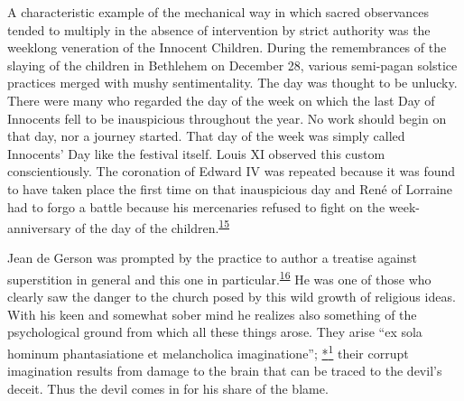 A characteristic example of the mechanical way in which sacred
observances tended to multiply in the absence of intervention by strict
authority was the weeklong veneration of the Innocent Children. During
the remembrances of the slaying of the children in Bethlehem on December
28, various semi-pagan solstice practices merged with mushy
sentimentality. The day was thought to be unlucky. There were many who
regarded the day of the week on which the last Day of Innocents fell to
be inauspicious throughout the year. No work should begin on that day,
nor a journey started. That day of the week was simply called Innocents'
Day like the festival itself. Louis XI observed this custom
conscientiously. The coronation of Edward IV was repeated because it was
found to have taken place the first time on that inauspicious day and
René of Lorraine had to forgo a battle because his mercenaries refused
to fight on the week-anniversary of the day of the
children.\textsuperscript{\protect\hypertarget{13_Chapter_Six__THE_DEPICTION_OF_TH.xhtmlux5cux23id_1241}{\protect\hyperlink{23_NOTES.xhtmlux5cux23id_1242}{15}}}

Jean de Gerson was prompted by the practice to author a treatise against
superstition in general and this one in
particular.\textsuperscript{\protect\hypertarget{13_Chapter_Six__THE_DEPICTION_OF_TH.xhtmlux5cux23id_1239}{\protect\hyperlink{23_NOTES.xhtmlux5cux23id_1240}{16}}}
He was one of those who clearly saw the danger to the church posed by
this wild growth of religious ideas. With his keen and somewhat sober
mind he realizes also something of the psychological ground from which
all these things arose. They arise ``ex sola hominum phantasiatione et
melancholica imaginatione'';
\protect\hypertarget{13_Chapter_Six__THE_DEPICTION_OF_TH.xhtmlux5cux23id_2989}{\protect\hyperlink{23_NOTES.xhtmlux5cux23id_2990}{*\textsuperscript{1}}}
their corrupt imagination results from damage to the brain that can be
traced to the devil's deceit. Thus the devil comes in for his share of
the blame.

